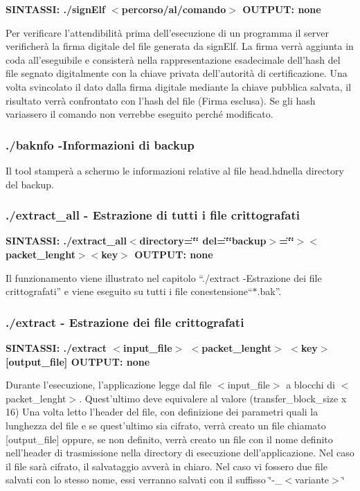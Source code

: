 {\bfseries S\+I\+N\+T\+A\+S\+SI\+: ./sign\+Elf $<$percorso/al/comando$>$ O\+U\+T\+P\+UT\+: none}

Per verificare l’attendibilità prima dell’esecuzione di un programma il server verificherà la firma digitale del file generata da sign\+Elf. La firma verrà aggiunta in coda all’eseguibile e consisterà nella rappresentazione esadecimale dell’hash del file segnato digitalmente con la chiave privata dell’autorità di certificazione. Una volta svincolato il dato dalla firma digitale mediante la chiave pubblica salvata, il risultato verrà confrontato con l’hash del file (Firma esclusa). Se gli hash variassero il comando non verrebbe eseguito perché modificato.

\subsubsection*{./baknfo​ ​-\/​ ​\+Informazioni​ ​di​ ​backup}

Il​ ​tool​ ​stamperà​ ​a​ ​schermo​ ​le​ ​informazioni​ ​relative​ ​al​ ​file​ ​head.\+hd​ ​nella directory​ ​del​ ​backup.

\subsubsection*{./extract\+\_\+all -\/ Estrazione​ ​di​ ​tutti​ ​i​ ​file​ ​crittografati}

{\bfseries S\+I\+N\+T\+A\+S\+SI\+:​ ​./extract\+\_\+all​ ​$<$directory ​=\char`\"{}\char`\"{} ​del​=\char`\"{}\char`\"{} ​backup$>$=\char`\"{}\char`\"{}$>$​ ​$<$packet\+\_\+lenght$>$​ ​$<$key$>$ O\+U\+T\+P\+UT\+:​ ​none}

Il​ ​funzionamento​ ​viene​ ​illustrato​ ​nel​ ​capitolo​ ​“./extract​ ​-\/​ ​\+Estrazione​ ​dei​ ​file crittografati”​ ​e​ ​viene​ ​eseguito​ ​su​ ​tutti​ ​i​ ​file​ ​con​ ​estensione​ ​“$\ast$.bak”.

\subsubsection*{./extract -\/ Estrazione dei file crittografati}

{\bfseries S\+I\+N\+T\+A\+S\+SI\+: ./extract $<$input\+\_\+file$>$ $<$packet\+\_\+lenght$>$ $<$key$>$ \mbox{[}output\+\_\+file\mbox{]} O\+U\+T\+P\+UT\+: none}

Durante l’esecuzione, l’applicazione legge dal file $<$input\+\_\+file$>$ a blocchi di $<$packet\+\_\+lenght$>$. Quest’ultimo deve equivalere al valore (transfer\+\_\+block\+\_\+size x 16) Una volta letto l’header del file, con definizione dei parametri quali la lunghezza del file e se quest’ultimo sia cifrato, verrà creato un file chiamato \mbox{[}output\+\_\+file\mbox{]} oppure, se non definito, verrà creato un file con il nome definito nell’header di trasmissione nella directory di esecuzione dell’applicazione. Nel caso il file sarà cifrato, il salvataggio avverà in chiaro. Nel caso vi fossero due file salvati con lo stesso nome, essi verranno salvati con il suffisso \char`\"{}-\/\+\_\+$<$variante$>$\char`\"{}

